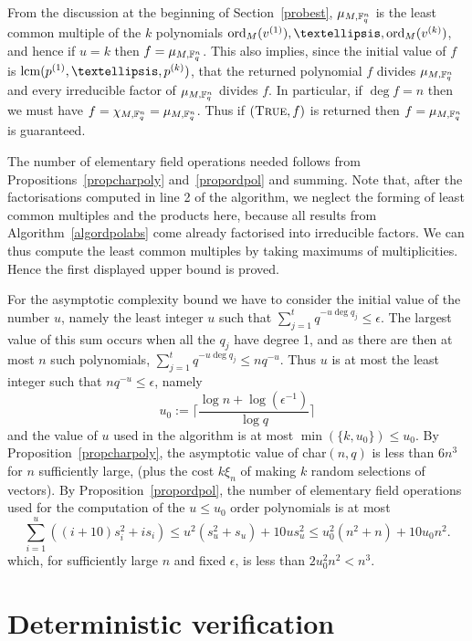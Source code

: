   From the discussion at the beginning of Section~\ref{probest},
$\mu_{M,\mathbb{F}_q^n}$ is the least common multiple of the $k$ polynomials
$\ord_M(v^{(1)}), \dots,\ord_M(v^{(k)})$, and hence if $u=k$ then
$f = \mu_{M,\mathbb{F}_q^n}$. This also implies, since the initial value
of $f$ is $\lcm(p^{(1)}, \ldots, p^{(k)})$, that the returned
polynomial $f$ divides $\mu_{M,\mathbb{F}_q^n}$ and every irreducible factor of
$\mu_{M,\mathbb{F}_q^n}$ divides $f$. In particular, if $\deg f =n$ then we must
have $f=\chi_{M,\mathbb{F}_q^n}=\mu_{M,\mathbb{F}_q^n}$. Thus if $(\mbox{\sc True},f)$
is returned then $f = \mu_{M,\mathbb{F}_q^n}$ is guaranteed.


The number of elementary field operations needed follows from 
Propositions~\ref{propcharpoly} and~\ref{propordpol} and summing. Note that,
after the factorisations computed in line 2 of the algorithm, we neglect
the forming of least common multiples and the products here, because
all results from Algorithm~\ref{algordpolabs} come already factorised
into irreducible factors. We can thus compute the least common multiples
by taking maximums of multiplicities. Hence the first displayed upper
bound is proved.

For the asymptotic complexity bound we have to consider the initial value of the number $u$,
namely the least integer $u$ such that $\sum_{j=1}^t q^{-u \deg q_j} \le \epsilon$.
The largest value of this sum occurs when all the $q_j$ have degree 1, and as there are 
then at most $n$ such polynomials,  $\sum_{j=1}^t q^{-u \deg q_j}\le nq^{-u}$. 
Thus $u$ is at most the least integer such that $nq^{-u}\le \epsilon$, namely 
\[
u_0:=\lceil \frac{\log n + \log (\epsilon^{-1})}{\log q}\rceil
\]
and the value of $u$ used in the algorithm is at most $\min(\{k,u_0\})\leq u_0$.
By Proposition~\ref{propcharpoly}, the asymptotic value of char$(n,q)$ is
less than $6n^3$ for $n$ sufficiently large, (plus the cost $k\xi_n$ 
of making $k$ random selections of vectors). 
By Proposition~\ref{propordpol},  the number of elementary
field operations used for the computation of the  $u\le u_0$ order polynomials
is at most
\[
\sum_{i=1}^u\left( (i+10)s_i^2+is_i\right) \leq u^2(s_u^2+s_u)+10us_u^2
\le u_0^2(n^2+n)+10u_0 n^2.
\]
which, for sufficiently large $n$ and fixed $\epsilon$, is less than $2u_0^2n^2<n^3$.
\proofend

\section{Deterministic verification}
\label{verify}

